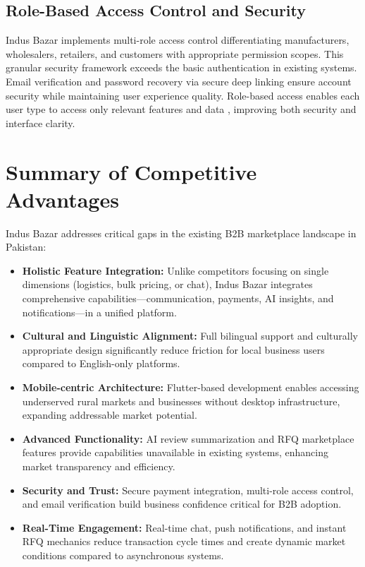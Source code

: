 \subsection{Role-Based Access Control and Security}

Indus Bazar implements multi-role access control differentiating manufacturers, wholesalers, retailers, and customers with appropriate permission scopes. This granular security framework exceeds the basic authentication in existing systems. Email verification and password recovery via secure deep linking ensure account security while maintaining user experience quality. Role-based access enables each user type to access only relevant features and data \cite{porter2001strategy}, improving both security and interface clarity.

\vspace{2em}

\section{Summary of Competitive Advantages}

Indus Bazar addresses critical gaps in the existing B2B marketplace landscape in Pakistan:

\begin{itemize}
    \item \textbf{Holistic Feature Integration:} Unlike competitors focusing on single dimensions (logistics, bulk pricing, or chat), Indus Bazar integrates comprehensive capabilities—communication, payments, AI insights, and notifications—in a unified platform.
    
    \item \textbf{Cultural and Linguistic Alignment:} Full bilingual support and culturally appropriate design significantly reduce friction for local business users compared to English-only platforms.
    
    \item \textbf{Mobile-centric Architecture:} Flutter-based development enables accessing underserved rural markets and businesses without desktop infrastructure, expanding addressable market potential.
    
    \item \textbf{Advanced Functionality:} AI review summarization and RFQ marketplace features provide capabilities unavailable in existing systems, enhancing market transparency and efficiency.
    
    \item \textbf{Security and Trust:} Secure payment integration, multi-role access control, and email verification build business confidence critical for B2B adoption.
    
    \item \textbf{Real-Time Engagement:} Real-time chat, push notifications, and instant RFQ mechanics reduce transaction cycle times and create dynamic market conditions compared to asynchronous systems.
\end{itemize}

